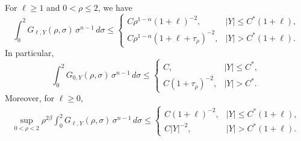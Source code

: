 \documentclass[10pt,a4paper]{amsart}
\begin{document}
\begin{proposition}\label{prop:Green:Shur}
For $\ell\ge 1$ and $0<\rho\le 2$, we have
\begin{equation}\label{eq_basic_R_schur_improved}
    \int_0^2 G_{\ell,Y}(\rho,\sigma) \, \sigma^{n-1} \, d\sigma \le \begin{cases}
        C \rho^{1-\alpha} (1+\ell)^{-2}, & |Y|\le C^*(1+\ell),\\[4pt]
        C \rho^{1-\alpha} (1+\ell+\tau_\rho)^{-2}, & |Y|> C^*(1+\ell).
    \end{cases}
\end{equation}
In particular,
\begin{equation}\label{eq_basic_R_schur_ell=0}
    \int_0^2 G_{0,Y}(\rho,\sigma) \, \sigma^{n-1} \, d\sigma \le \begin{cases}
        C, & |Y|\le C^*,\\[4pt]
        C (1+\tau_\rho)^{-2}, & |Y|> C^*.
    \end{cases}
\end{equation}
Moreover, for $\ell \ge 0$,
\begin{align}\label{eq_basic_R_schur}
\sup_{0<\rho<2} \rho^{2\beta} \int_0^2 G_{\ell,Y}(\rho,\sigma) \, \sigma^{n-1} \, d\sigma \le \begin{cases}
        C (1+\ell)^{-2}, & |Y|\le C^*(1+\ell),\\[4pt]
        C |Y|^{-2}, & |Y|> C^*(1+\ell).
    \end{cases}
\end{align}
\end{proposition}
\end{document}
